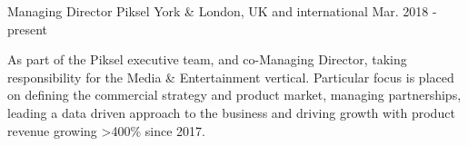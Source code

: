 


\begin{cventries}


\cvexpentry
{Managing Director} %
{Piksel} %
{York \& London, UK and international} %
{Mar. 2018 - present} %
{
\begin{cvitemstitle}
\item {As part of the Piksel executive team, and co-Managing Director, taking responsibility for the Media \& Entertainment vertical. Particular focus is placed on defining the commercial strategy and product market, managing partnerships, leading a data driven approach to the business and driving growth with product revenue growing >400\% since 2017.}
\end{cvitemstitle}
}
{ %
\begin{cvitems}
\end{cvitems}
}



\end{cventries}
